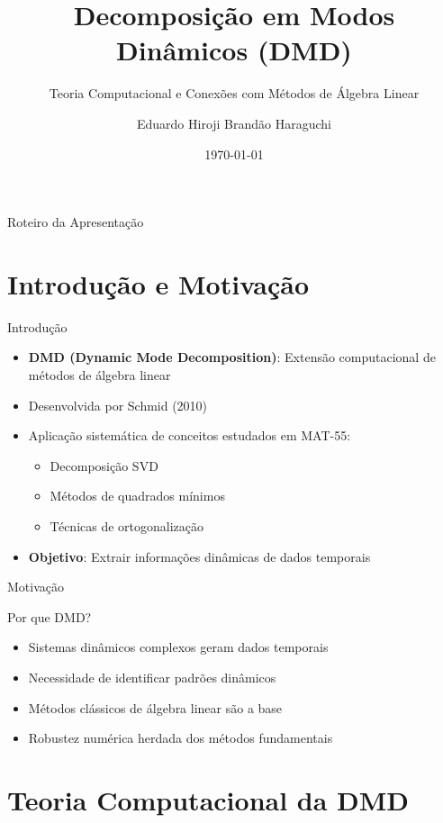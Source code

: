 \documentclass[aspectratio=169]{beamer}
\title{Decomposição em Modos Dinâmicos (DMD)}
\subtitle{Teoria Computacional e Conexões com Métodos de Álgebra Linear}
\author{Eduardo Hiroji Brandão Haraguchi}
\institute{Instituto Tecnológico de Aeronáutica\\MAT-55}
\date{\today}
\begin{document}
\begin{frame}
    \titlepage
\end{frame}

\begin{frame}{Roteiro da Apresentação}
    \tableofcontents
\end{frame}

\section{Introdução e Motivação}

\begin{frame}{Introdução}
    \begin{itemize}
        \item \textbf{DMD (Dynamic Mode Decomposition)}: Extensão computacional de métodos de álgebra linear
        \item Desenvolvida por Schmid (2010)
        \item Aplicação sistemática de conceitos estudados em MAT-55:
        \begin{itemize}
            \item Decomposição SVD
            \item Métodos de quadrados mínimos
            \item Técnicas de ortogonalização
        \end{itemize}
        \item \textbf{Objetivo}: Extrair informações dinâmicas de dados temporais
    \end{itemize}
\end{frame}

\begin{frame}{Motivação}
    \begin{block}{Por que DMD?}
        \begin{itemize}
            \item Sistemas dinâmicos complexos geram dados temporais
            \item Necessidade de identificar padrões dinâmicos
            \item Métodos clássicos de álgebra linear são a base
            \item Robustez numérica herdada dos métodos fundamentais
        \end{itemize}
    \end{block}
\end{frame}

\section{Teoria Computacional da DMD}
\end{document}
